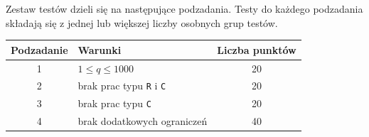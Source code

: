 \documentclass[10pt]{article}
\begin{document}
    Zestaw testów dzieli się na następujące podzadania. Testy do każdego podzadania składają się z jednej lub większej liczby osobnych grup testów.
    
    \begin{center}
        \begin{tabular}{ |c|p{9cm}|c| }
            \hline
            \textbf{Podzadanie} & \textbf{Warunki} & \textbf{Liczba punktów}\\
            \hline
            1 & $1 \leq q \leq 1000$ & 20\\
            \hline
            2 & brak prac typu \texttt{R} i \texttt{C} & 20\\
            \hline
            3 & brak prac typu \texttt{C} & 20\\
            \hline
            4 & brak dodatkowych ograniczeń & 40\\
            \hline
        \end{tabular}
    \end{center}
\end{document}
